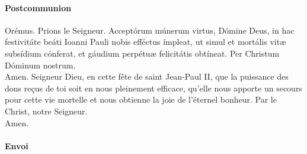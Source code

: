 \documentclass[twoside]{article}
\begin{document}
\paragraph{Postcommunion}
\begin{paracol}{2}
\vv Orémus.
\switchcolumn
\vv Prions le Seigneur.
\switchcolumn*
Acceptórum múnerum virtus, Dómine Deus,
in hac festivitáte beáti Ioanni Pauli nobis efféctus ímpleat,
ut simul et mortális vitæ subsídium cónferat,
et gáudium perpétuæ felicitátis obtíneat.
Per Christum Dóminum nostrum.\\
\rr Amen.
\switchcolumn
Seigneur Dieu, en cette fête de saint Jean-Paul II, que la puissance des dons reçus de toi
soit en nous pleinement efficace,
qu'elle nous apporte un secours pour cette vie mortelle
et nous obtienne la joie de l'éternel bonheur.
Par le Christ, notre Seigneur. \\
\rr Amen.
\end{paracol}

\paragraph{Envoi}

\end{document}
